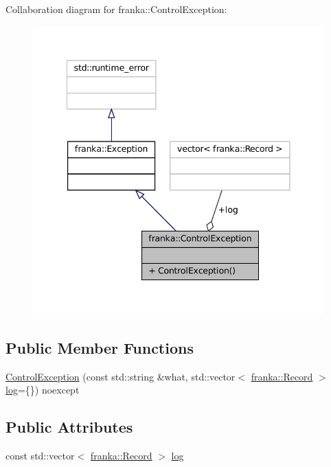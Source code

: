 Collaboration diagram for franka\+:\+:Control\+Exception\+:
\nopagebreak
\begin{figure}[H]
\begin{center}
\leavevmode
\includegraphics[width=341pt]{structfranka_1_1ControlException__coll__graph}
\end{center}
\end{figure}
\subsection*{Public Member Functions}
\begin{DoxyCompactItemize}
\item 
\hyperlink{structfranka_1_1ControlException_a2efb9628eef80a3819031dbf2e2cb518}{Control\+Exception} (const std\+::string \&what, std\+::vector$<$ \hyperlink{structfranka_1_1Record}{franka\+::\+Record} $>$ \hyperlink{structfranka_1_1ControlException_ae57f0ac0a9aa195057af1f1cc712b41e}{log}=\{\}) noexcept
\end{DoxyCompactItemize}
\subsection*{Public Attributes}
\begin{DoxyCompactItemize}
\item 
const std\+::vector$<$ \hyperlink{structfranka_1_1Record}{franka\+::\+Record} $>$ \hyperlink{structfranka_1_1ControlException_ae57f0ac0a9aa195057af1f1cc712b41e}{log}
\end{DoxyCompactItemize}



